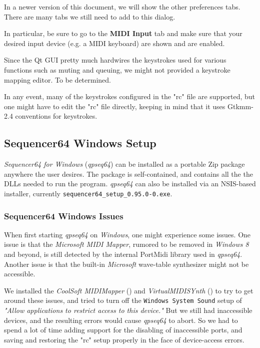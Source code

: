    In a newer version of this document, we will show the other preferences
   tabs.  There are many tabs we still need to add to this dialog.

   In particular, be sure to go to the \textbf{MIDI Input} tab and
   make sure that your desired input device (e.g. a MIDI keyboard) are shown
   and are enabled.

   Since the Qt GUI pretty much hardwires the keystrokes used for various
   functions such as muting and queuing, we might not provided a keystroke
   mapping editor.  To be determined.

   In any event, many of the keystrokes configured in the "rc" file are
   supported, but one might have to edit the "rc" file directly, keeping
   in mind that it uses Gtkmm-2.4 conventions for keystrokes.

\subsection{Sequencer64 Windows Setup}
\label{subsec:qt_portmidi_windows_setup}

   \textsl{Sequencer64 for Windows} (\textsl{qpseq64}) can be installed
   as a portable Zip package anywhere the user desires.  The package is
   self-contained, and contains all the the DLLs needed to run the program.
   \textsl{qpseq64} can also be installed via an NSIS-based installer,
   currently \texttt{sequencer64\_setup\_0.95.0-0.exe}.

\subsubsection{Sequencer64 Windows Issues}
\label{subsubsec:qt_portmidi_windows_setup_issues}

    When first starting \textsl{qpseq64} on \textsl{Windows}, one might
    experience some issues.  One issue is that the \textsl{Microsoft MIDI
    Mapper}, rumored to be removed in \textsl{Windows 8} and beyond, is still
    detected by the internal PortMidi library used in \textsl{qpseq64}.
    Another issue is that the built-in \textsl{Microsoft} wave-table
    synthesizer might not be accessible.

    We installed the
    \textsl{CoolSoft MIDIMapper} (\cite{midimapper}) and
    \textsl{VirtualMIDISYnth} (\cite{midisynth}) to try to get
    around these issues, and tried to turn off the
    \texttt{Windows System Sound} setup of
    \textsl{"Allow applications to restrict access to this device."}
    But we still had
    inaccessible devices, and the resulting errors would cause
    \textsl{qpseq64} to
    abort.  So we had to spend a lot of time adding support for
    the disabling of
    inaccessible ports, and saving and restoring the "rc" setup properly
    in the face of device-access errors.

